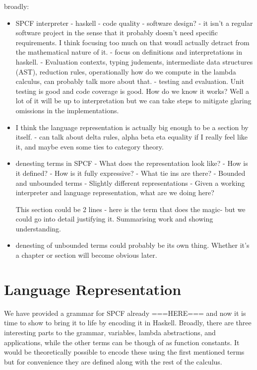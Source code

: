 \documentclass[12pt,a4paper]{report}
\theoremstyle{definition}
\theoremstyle{remark}
\begin{document}
broadly:
\begin{itemize}
    \item SPCF interpreter
        - haskell 
        - code quality
        - software design?
        - it isn't a regular software project in the sense that it probably doesn't need specific requirements. I think focusing too much on that woudl actually detract from the mathematical nature of it.
        - focus on definitions and interpretations in haskell.
        - Evaluation contexts, typing judements, intermediate data structures (AST), reduction rules, operationally how do we compute in the lambda calculus, can probably talk more about that.
        - testing and evaluation. Unit testing is good and code coverage is good. How do we know it works? Well a lot of it will be up to interpretation but we can take steps to mitigate glaring omissions in the implementations.
    \item I think the language representation is actually big enough to be a section by itself.
        - can talk about delta rules, alpha beta eta equality if I really feel like it, and maybe even some ties to category theory.
    \item denesting terms in SPCF
        - What does the representation look like?
        - How is it defined?
        - How is it fully expressive?
        - What tie ins are there? 
        - Bounded and unbounded terms
        - Slightly different representations
        - Given a working interpreter and language representation, what are we doing here?

        This section could be 2 lines - here is the term that does the magic- but we could go into detail justifying it. Summarising work and showing understanding.
    \item denesting of unbounded terms could probably be its own thing. Whether it's a chapter or section will become obvious later.
\end{itemize}

\section{Language Representation}\label{section: language representation}

We have provided a grammar for SPCF already ===HERE=== and now it is time to show to bring it to life by encoding it in Haskell. Broadly, there are three interesting parts to the grammar, variables, lambda abstractions, and applications, while the other terms can be though of as function constants. It would be theoretically possible to encode these using the first mentioned terms but for convenience they are defined along with the rest of the calculus. 
\end{document}
